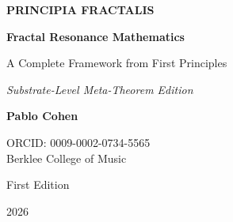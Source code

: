 \begin{titlepage}
\centering
\vspace*{2cm}

{\Huge\bfseries PRINCIPIA FRACTALIS}

\vspace{0.8cm}

{\huge\bfseries Fractal Resonance Mathematics}

\vspace{1cm}

{\LARGE A Complete Framework from First Principles}

\vspace{0.5cm}

{\Large\itshape Substrate-Level Meta-Theorem Edition}

\vspace{1.5cm}

{\Large\textbf{Pablo Cohen}}

\vspace{0.5cm}

{\large
ORCID: 0009-0002-0734-5565\\
Berklee College of Music
}

\vspace{2cm}


\vfill

{\large First Edition}

\vspace{0.5cm}

{\large 2026}

\vspace{1cm}


\end{titlepage}
